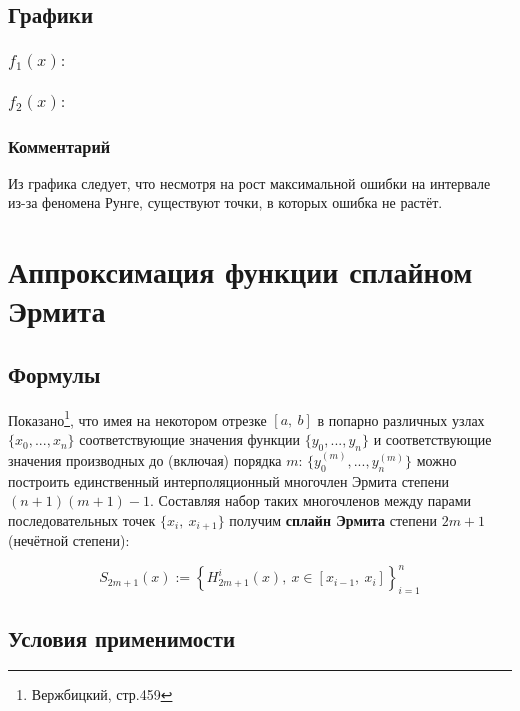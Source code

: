 \subsection{Графики}

\subsubsection{$f_1(x):$}



\clearpage

\subsubsection{$f_2(x):$}



\subsubsection*{Комментарий}
Из графика следует, что несмотря на рост максимальной ошибки на интервале из-за феномена Рунге, существуют точки, в которых ошибка не растёт.

\clearpage

\section{Аппроксимация функции сплайном Эрмита}

\subsection{Формулы}

Показано\footnote{Вержбицкий, стр.459}, что имея на некотором отрезке $[a,~b]$ в попарно различных узлах $\{x_0,...,x_n\}$ соответствующие значения функции $\{y_0,...,y_n\}$ и соответствующие значения производных до (включая) порядка $m$: $\{y^{(m)}_0,...,y^{(m)}_n\}$ можно построить единственный интерполяционный многочлен Эрмита степени $(n+1)(m+1)-1$. Составляя набор таких многочленов между парами последовательных точек $\{x_i,~x_{i+1}\}$ получим \textbf{сплайн Эрмита} степени $2m+1$ (нечётной степени):

\begin{equation}
    S_{2m+1}(x):=\left\lbrace H^i_{2m+1} (x), ~ x \in [x_{i-1},~ x_i] \right\rbrace^n_{i=1}
\end{equation}

\subsection{Условия применимости}

